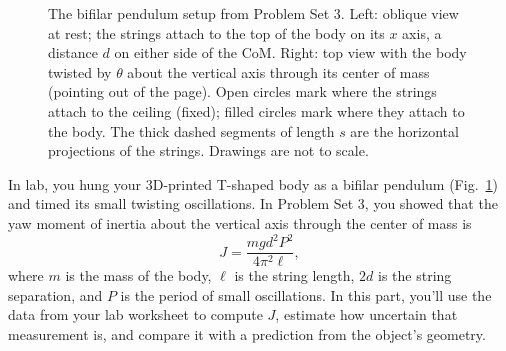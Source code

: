 \documentclass[11pt,letterpaper]{article}
\begin{document}
\begin{figure}[h]
\caption{The bifilar pendulum setup from Problem Set 3. Left: oblique view at rest; the strings attach to the top of the body on its $x$ axis, a distance $d$ on either side of the CoM. Right: top view with the body twisted by $\theta$ about the vertical axis through its center of mass (pointing out of the page). Open circles mark where the strings attach to the ceiling (fixed); filled circles mark where they attach to the body. The thick dashed segments of length $s$ are the horizontal projections of the strings. Drawings are not to scale.}
\label{fig:bifilar}
\end{figure}

\noindent In lab, you hung your 3D-printed T-shaped body as a bifilar pendulum (Fig.~\ref{fig:bifilar}) and timed its small twisting oscillations. In Problem Set 3, you showed that the yaw moment of inertia about the vertical axis through the center of mass is
\[
J = \frac{mgd^2P^2}{4\pi^2\ell},
\]
where $m$ is the mass of the body, $\ell$ is the string length, $2d$ is the string separation, and $P$ is the period of small oscillations. In this part, you'll use the data from your lab worksheet to compute $J$, estimate how uncertain that measurement is, and compare it with a prediction from the object's geometry.
\end{document}
